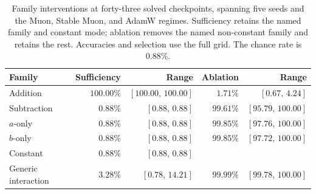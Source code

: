 \begin{table}[t]
\centering\small
\caption{Family interventions at forty-three solved checkpoints, spanning five seeds and the
Muon, Stable Muon, and AdamW regimes. Sufficiency retains the named family and constant mode; ablation
removes the named non-constant family and retains the rest. Accuracies and selection use the full grid. The chance rate is $0.88\%$.}
\label{tab:families-result}
\begin{tabular}{lrrrr}
\toprule
Family & Sufficiency & Range & Ablation & Range \\
\midrule
Addition & $100.00\%$ & $[100.00,\,100.00]$ & $1.71\%$ & $[0.67,\,4.24]$ \\
Subtraction & $0.88\%$ & $[0.88,\,0.88]$ & $99.61\%$ & $[95.79,\,100.00]$ \\
$a$-only & $0.88\%$ & $[0.88,\,0.88]$ & $99.85\%$ & $[97.76,\,100.00]$ \\
$b$-only & $0.88\%$ & $[0.88,\,0.88]$ & $99.85\%$ & $[97.72,\,100.00]$ \\
Constant & $0.88\%$ & $[0.88,\,0.88]$ & & \\
Generic interaction & $3.28\%$ & $[0.78,\,14.21]$ & $99.99\%$ & $[99.78,\,100.00]$ \\
\bottomrule
\end{tabular}
\end{table}
